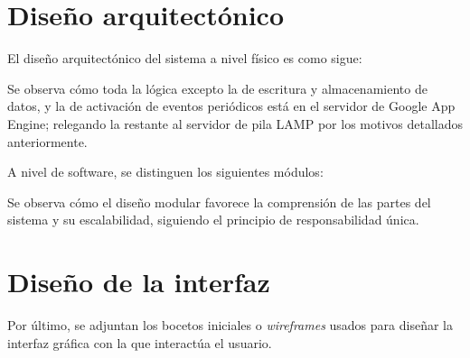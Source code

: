 \section{Diseño arquitectónico}

El diseño arquitectónico del sistema a nivel físico es como sigue:


Se observa cómo toda la lógica excepto la de escritura y almacenamiento de datos, y la de activación de eventos periódicos está en el servidor de Google App Engine; relegando la restante al servidor de pila LAMP por los motivos detallados anteriormente.

A nivel de software, se distinguen los siguientes módulos:


Se observa cómo el diseño modular favorece la comprensión de las partes del sistema y su escalabilidad, siguiendo el principio de responsabilidad única.

\section{Diseño de la interfaz}

Por último, se adjuntan los bocetos iniciales o \textit{wireframes} usados para diseñar la interfaz gráfica con la que interactúa el usuario.

